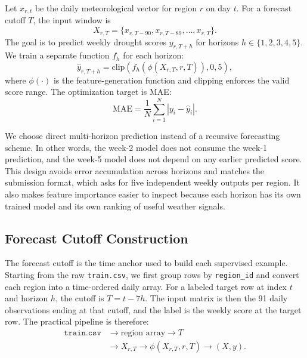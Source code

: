 \documentclass[conference]{IEEEtran}
\begin{document}
Let $x_{r,t}$ be the daily meteorological vector for region $r$ on day $t$.
For a forecast cutoff $T$, the input window is
\begin{equation}
X_{r,T} = \{x_{r,T-90}, x_{r,T-89}, \ldots, x_{r,T}\}.
\end{equation}
The goal is to predict weekly drought scores
$y_{r,T+h}$ for horizons $h \in \{1,2,3,4,5\}$. We train a separate function
$f_h$ for each horizon:
\begin{equation}
\hat{y}_{r,T+h} = \mathrm{clip}(f_h(\phi(X_{r,T}, r, T)), 0, 5),
\end{equation}
where $\phi(\cdot)$ is the feature-generation function and clipping enforces the
valid score range. The optimization target is MAE:
\begin{equation}
\mathrm{MAE} = \frac{1}{N}\sum_{i=1}^{N} |y_i - \hat{y}_i|.
\end{equation}

We choose direct multi-horizon prediction instead of a recursive forecasting
scheme. In other words, the week-2 model does not consume the week-1 prediction,
and the week-5 model does not depend on any earlier predicted score. This design
avoids error accumulation across horizons and matches the submission format,
which asks for five independent weekly outputs per region. It also makes feature
importance easier to inspect because each horizon has its own trained model and
its own ranking of useful weather signals.

\subsection{Forecast Cutoff Construction}

The forecast cutoff is the time anchor used to build each supervised example.
Starting from the raw \texttt{train.csv}, we first group rows by
\texttt{region\_id} and convert each region into a time-ordered daily array.
For a labeled target row at index $t$ and horizon $h$, the cutoff is
$T=t-7h$. The input matrix is then the 91 daily observations ending at that
cutoff, and the label is the weekly score at the target row. The practical
pipeline is therefore:
\begin{equation}
\begin{aligned}
\texttt{train.csv} &\rightarrow \text{region array} \rightarrow T \\
&\rightarrow X_{r,T} \rightarrow \phi(X_{r,T},r,T) \rightarrow (X,y).
\end{aligned}
\end{equation}
\end{document}
